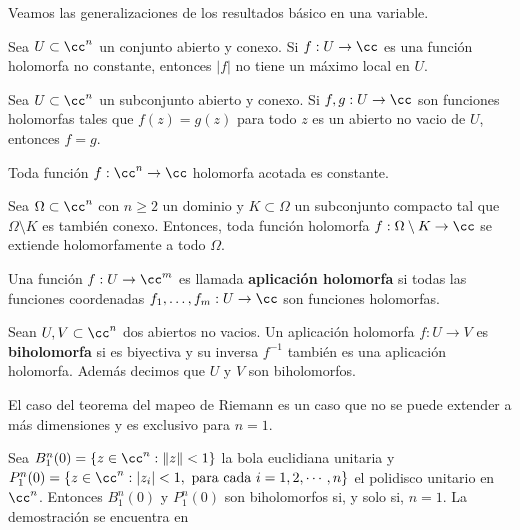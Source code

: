 Veamos las generalizaciones de los resultados básico en una variable.

\begin{theorem}\label{Principiodelmodulomaximo}
	Sea $U\subset \cc^n$ un conjunto abierto y conexo. Si $f:U\to\cc$ es una función holomorfa no constante, entonces $|f|$ no tiene un máximo local en $U$.
\end{theorem}

\begin{theorem}[de la identidad]\label{identidad}
	Sea $U\subset \cc^n$ un subconjunto abierto y conexo. Si $f,g:U\to \cc$ son funciones holomorfas tales que $f(z)=g(z)$ para todo $z$ es un abierto no vacio de $U$, entonces $f=g$.
\end{theorem}

\begin{theorem}[de Lioville]
	Toda función $f:\cc^n\to\cc$ holomorfa acotada es constante.  
\end{theorem}

\begin{theorem}[Hartogs]\label{hartogs}
	Sea $\Omega\subset\cc^n$ con $n\geq 2$ un dominio y $K\subset\Omega$ un subconjunto compacto tal que $\Omega\setminus K$ es también conexo. Entonces, toda función holomorfa $f:\Omega\setminus K\to\cc$ se extiende holomorfamente a todo $\Omega.$
\end{theorem}


\begin{definition}\label{mapholocn}
	Una función $f:U\to\cc^m$ es llamada \textbf{aplicación holomorfa} si todas las funciones coordenadas $f_1,\dots,f_m:U\to\cc$ son funciones holomorfas.
\end{definition}


\begin{definition}
	Sean $U,V\subset \cc^n$ dos abiertos no vacios. Un aplicación holomorfa $f:U\to V$ es \textbf{biholomorfa} si es biyectiva y su inversa $f^{-1}$ también es una aplicación holomorfa. Además decimos que $U$ y $V$ son biholomorfos. 
\end{definition}

El caso del teorema del mapeo de Riemann es un caso que no se puede extender a más dimensiones y es exclusivo para $n=1$.
\begin{theorem}
	Sea $B_1^n(0)=\{z\in\cc^n: \|z\|<1\}$ la bola euclidiana unitaria y $P_1^n(0)=\{z\in\cc^n:|z_i|<1,\text{ para cada }i=1,2,\cdots, n\}$ el polidisco unitario en $\cc^n$. Entonces $B_1^n(0)$ y $P_1^n(0)$ son biholomorfos si, y solo si, $n=1$. La demostración se encuentra en \parencite[Teo 3.9, Pg. 78]{scheidemann}
\end{theorem}


